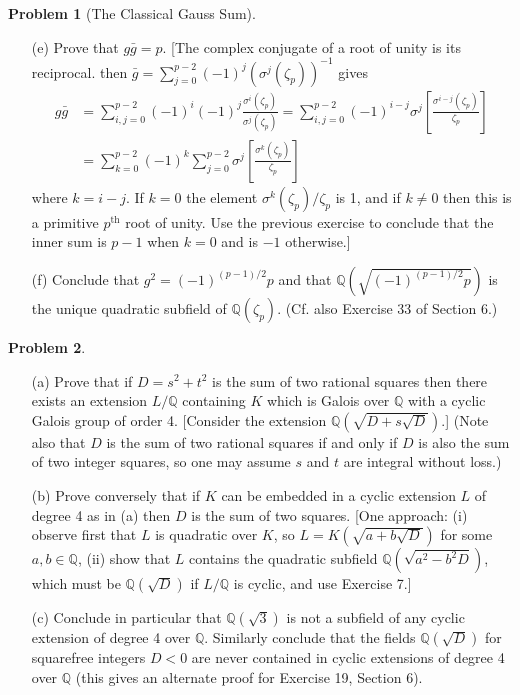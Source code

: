 \documentclass{article}
\theoremstyle{definition}
\newtheorem{prob}{Problem}
\newcommand{\QQ}{\mathbb Q}
\begin{document}
\begin{prob}[The Classical Gauss Sum]
\begin{enumerate}
		\item[(e)] Prove that $g \bar{g} = p$.
			[The complex conjugate of a root of unity is its reciprocal.
			then $\bar{g} = \sum_{j = 0}^{p - 2} (-1)^j (\sigma^j(\zeta_p))^{-1}$ gives
			\[
				\begin{split}
					g \bar{g} &= \sum_{i, j = 0}^{p - 2} (-1)^i (-1)^j \frac{\sigma^i (\zeta_p)}{\sigma^j (\zeta_p)} = \sum_{i, j = 0}^{p - 2} (-1)^{i - j} \sigma^j \left[ \frac{\sigma^{i - j}(\zeta_p)}{\zeta_p} \right]\\
					&= \sum_{k = 0}^{p - 2} (-1)^k \sum_{j = 0}^{p - 2} \sigma^j \left[ \frac{\sigma^k(\zeta_p)}{\zeta_p} \right]
				\end{split}
			\]
			where $k = i - j$.
			If $k = 0$ the element $\sigma^k(\zeta_p)/\zeta_p$ is 1, and if $k \neq 0$ then this is a primitive $p^{\text{th}}$ root of unity.
			Use the previous exercise to conclude that the inner sum is $p - 1$ when $k = 0$ and is $-1$ otherwise.]

		\item[(f)] Conclude that $g^2 = (-1)^{(p - 1)/2} p$ and that $\QQ(\sqrt{(-1)^{(p - 1)/2} p})$ is the unique quadratic subfield of $\QQ(\zeta_p)$. (Cf. also Exercise 33 of Section 6.)
	\end{enumerate}
\end{prob}

\setcounter{prob}{18}
\begin{prob}
	\begin{enumerate}
		\item[(a)] Prove that if $D = s^2 + t^2$ is the sum of two rational squares then there exists an extension $L/\QQ$ containing $K$ which is Galois over $\QQ$ with a cyclic Galois group of order 4.
			[Consider the extension $\QQ(\sqrt{D + s \sqrt{D}})$.]
			(Note also that $D$ is the sum of two rational squares if and only if $D$ is also the sum of two integer squares, so one may assume $s$ and $t$ are integral without loss.)

		\item[(b)] Prove conversely that if $K$ can be embedded in a cyclic extension $L$ of degree 4 as in (a) then $D$ is the sum of two squares.
			[One approach: (i) observe first that $L$ is quadratic over $K$, so $L = K(\sqrt{a + b \sqrt{D}})$ for some $a, b \in \QQ$,
			(ii) show that $L$ contains the quadratic subfield $\QQ(\sqrt{a^2 - b^2 D})$, which must be $\QQ(\sqrt{D})$ if $L/\QQ$ is cyclic, and use Exercise 7.] 

		\item[(c)] Conclude in particular that $\QQ(\sqrt{3})$ is not a subfield of any cyclic extension of degree 4 over $\QQ$.
			Similarly conclude that the fields $\QQ(\sqrt{D})$ for squarefree integers $D < 0$ are never contained in cyclic extensions of degree 4 over $\QQ$ (this gives an alternate proof for Exercise 19, Section 6).
	\end{enumerate}
\end{prob}
\end{document}
